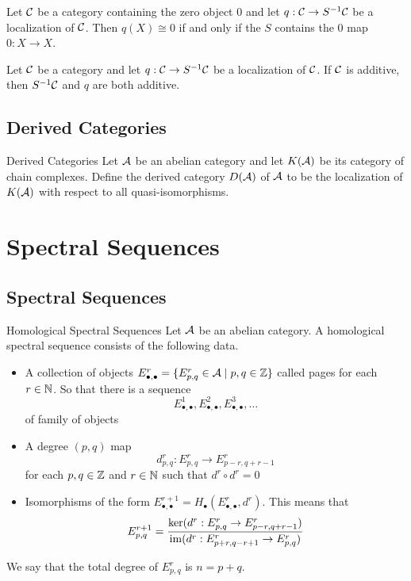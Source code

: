 \documentclass[a4paper]{article}
\begin{document}
\begin{crl}{}{} Let $\mathcal{C}$ be a category containing the zero object $0$ and let $q:\mathcal{C}\to S^{-1}\mathcal{C}$ be a localization of $\mathcal{C}$. Then $q(X)\cong 0$ if and only if the $S$ contains the $0$ map $0:X\to X$. 
\end{crl}

\begin{crl}{}{} Let $\mathcal{C}$ be a category and let $q:\mathcal{C}\to S^{-1}\mathcal{C}$ be a localization of $\mathcal{C}$. If $\mathcal{C}$ is additive, then $S^{-1}\mathcal{C}$ and $q$ are both additive. 
\end{crl}

\subsection{Derived Categories}
\begin{defn}{Derived Categories}{} Let $\mathcal{A}$ be an abelian category and let $K(\mathcal{A})$ be its category of chain complexes. Define the derived category $D(\mathcal{A})$ of $\mathcal{A}$ to be the localization of $K(\mathcal{A})$ with respect to all quasi-isomorphisms. 
\end{defn}

\pagebreak
\section{Spectral Sequences}
\subsection{Spectral Sequences}
\begin{defn}{Homological Spectral Sequences}{} Let $\mathcal{A}$ be an abelian category. A homological spectral sequence consists of the following data.  
\begin{itemize}
\item A collection of objects $E_{\bullet,\bullet}^r=\{E_{p,q}^r\in\mathcal{A}\;|\;p,q\in\mathbb{Z}\}$ called pages for each $r\in\mathbb{N}$. So that there is a sequence $$E_{\bullet,\bullet}^1,E_{\bullet,\bullet}^2,E_{\bullet,\bullet}^3,\dots$$ of family of objects
\item A degree $(p,q)$ map $$d_{p,q}^r:E_{p,q}^r\to E_{p-r,q+r-1}^r$$ for each $p,q\in\mathbb{Z}$ and $r\in\mathbb{N}$ such that $d^r\circ d^r=0$
\item Isomorphisms of the form $E_{\bullet,\bullet}^{r+1}=H_\bullet(E_{\bullet,\bullet}^r,d^r)$. This means that $$E_{p,q}^{r+1}=\frac{\ker(d^r:E_{p,q}^r\to E_{p-r,q+r-1}^r)}{\operatorname{im}(d^r:E_{p+r,q-r+1}^r\to E_{p,q}^r)}$$
\end{itemize}
We say that the total degree of $E_{p,q}^r$ is $n=p+q$. 
\end{defn}
\end{document}
